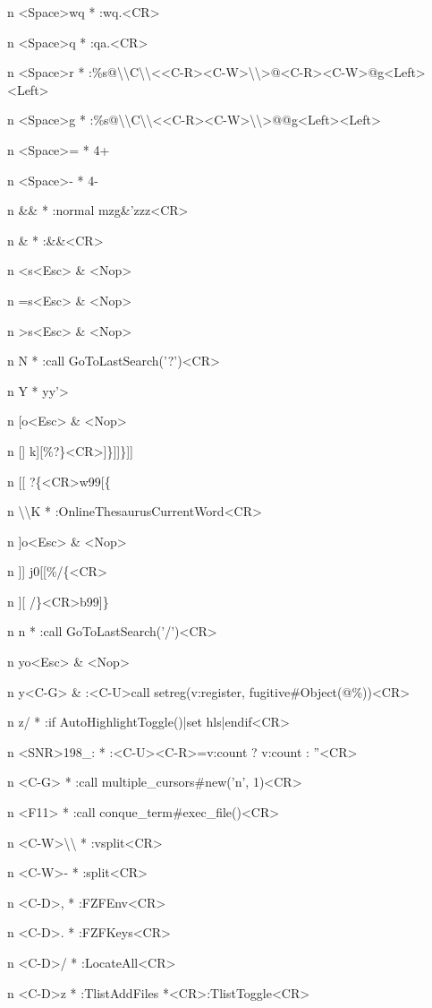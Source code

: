 \documentclass[11pt,a4paper,twoside]{book}
\begin{document}
n  <Space>wq  * :wq.<CR>

n  <Space>q  * :qa.<CR>

n  <Space>r  * :\%s@\textbackslash{}\textbackslash{}C\textbackslash{}\textbackslash{}<<C-R><C-W>\textbackslash{}\textbackslash{}>@<C-R><C-W>@g<Left><Left>

n  <Space>g  * :\%s@\textbackslash{}\textbackslash{}C\textbackslash{}\textbackslash{}<<C-R><C-W>\textbackslash{}\textbackslash{}>@@g<Left><Left>

n  <Space>=  * 4+

n  <Space>-  * 4-

n  \&\&  * :normal mzg\&'zzz<CR>

n  \&  * :\&\&<CR>

n  <s<Esc>  \& <Nop>

n  =s<Esc>  \& <Nop>

n  >s<Esc>  \& <Nop>

n  N  * :call GoToLastSearch('?')<CR>

n  Y  * yy'>

n  [o<Esc>  \& <Nop>

n  []  k][\%?\}<CR>]\}]]\}]]

n  [[  ?\{<CR>w99[\{

n  \textbackslash{}\textbackslash{}K  * :OnlineThesaurusCurrentWord<CR>

n  ]o<Esc>  \& <Nop>

n  ]]  j0[[\%/\{<CR>

n  ][  /\}<CR>b99]\}

n  n  * :call GoToLastSearch('/')<CR>

n  yo<Esc>  \& <Nop>

n  y<C-G>  \& :<C-U>call setreg(v:register, fugitive\#Object(@\%))<CR>

n  z/  * :if AutoHighlightToggle()|set hls|endif<CR>

n  <SNR>198\_:  * :<C-U><C-R>=v:count ? v:count : ''<CR>

n  <C-G>  * :call multiple\_cursors\#new('n', 1)<CR>

n  <F11>  * :call conque\_term\#exec\_file()<CR>

n  <C-W>\textbackslash{}\textbackslash{}  * :vsplit<CR>

n  <C-W>-  * :split<CR>

n  <C-D>,  * :FZFEnv<CR>

n  <C-D>.  * :FZFKeys<CR>

n  <C-D>/  * :LocateAll<CR>

n  <C-D>z  * :TlistAddFiles *<CR>:TlistToggle<CR>
\end{document}
